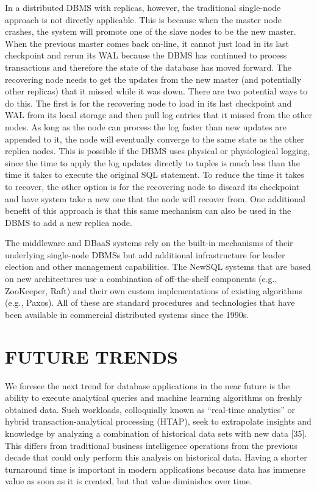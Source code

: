 \documentclass[a4paper,11pt,twoside,openright]{article}
\begin{document}
In a distributed DBMS with replicas, however, the traditional
single-node approach is not directly applicable. This is because when
the master node crashes, the system will promote one of the slave nodes
to be the new master. When the previous master comes back on-line, it
cannot just load in its last checkpoint and rerun its WAL because the
DBMS has continued to process transactions and therefore the state of
the database has moved forward. The recovering node needs to get the
updates from the new master (and potentially other replicas) that it
missed while it was down. There are two potential ways to do this. The
first is for the recovering node to load in its last checkpoint and WAL
from its local storage and then pull log entries that it missed from the
other nodes. As long as the node can process the log faster than new
updates are appended to it, the node will eventually converge to the
same state as the other replica nodes. This is possible if the DBMS uses
physical or physiological logging, since the time to apply the log
updates directly to tuples is much less than the time it takes to
execute the original SQL statement. To reduce the time it takes to
recover, the other option is for the recovering node to discard its
checkpoint and have system take a new one that the node will recover
from. One additional benefit of this approach is that this same
mechanism can also be used in the DBMS to add a new replica node.

The middleware and DBaaS systems rely on the built-in mechanisms of
their underlying single-node DBMSs but add additional infrastructure for
leader election and other management capabilities. The NewSQL systems
that are based on new architectures use a combination of off-the-shelf
components (e.g., ZooKeeper, Raft) and their own custom implementations
of existing algorithms (e.g., Paxos). All of these are standard
procedures and technologies that have been available in commercial
distributed systems since the 1990s.

\hypertarget{future-trends}{%
\section{FUTURE TRENDS}\label{future-trends}}

We foresee the next trend for database applications in the near future
is the ability to execute analytical queries and machine learning
algorithms on freshly obtained data. Such workloads, colloquially known
as ``real-time analytics'' or hybrid transaction-analytical processing
(HTAP), seek to extrapolate insights and knowledge by analyzing a
combination of historical data sets with new data {[}35{]}. This differs
from traditional business intelligence operations from the previous
decade that could only perform this analysis on historical data. Having
a shorter turnaround time is important in modern applications because
data has immense value as soon as it is created, but that value
diminishes over time.
\end{document}
